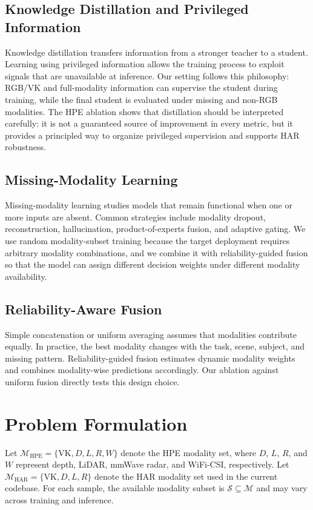 \documentclass[journal]{IEEEtran}
\begin{document}
\subsection{Knowledge Distillation and Privileged Information}
Knowledge distillation transfers information from a stronger teacher to a student. Learning using privileged information allows the training process to exploit signals that are unavailable at inference. Our setting follows this philosophy: RGB/VK and full-modality information can supervise the student during training, while the final student is evaluated under missing and non-RGB modalities. The HPE ablation shows that distillation should be interpreted carefully: it is not a guaranteed source of improvement in every metric, but it provides a principled way to organize privileged supervision and supports HAR robustness.

\subsection{Missing-Modality Learning}
Missing-modality learning studies models that remain functional when one or more inputs are absent. Common strategies include modality dropout, reconstruction, hallucination, product-of-experts fusion, and adaptive gating. We use random modality-subset training because the target deployment requires arbitrary modality combinations, and we combine it with reliability-guided fusion so that the model can assign different decision weights under different modality availability.

\subsection{Reliability-Aware Fusion}
Simple concatenation or uniform averaging assumes that modalities contribute equally. In practice, the best modality changes with the task, scene, subject, and missing pattern. Reliability-guided fusion estimates dynamic modality weights and combines modality-wise predictions accordingly. Our ablation against uniform fusion directly tests this design choice.

\section{Problem Formulation}

Let $\mathcal{M}_{\mathrm{HPE}}=\{\mathrm{VK},D,L,R,W\}$ denote the HPE modality set, where $D$, $L$, $R$, and $W$ represent depth, LiDAR, mmWave radar, and WiFi-CSI, respectively. Let $\mathcal{M}_{\mathrm{HAR}}=\{\mathrm{VK},D,L,R\}$ denote the HAR modality set used in the current codebase. For each sample, the available modality subset is $\mathcal{S}\subseteq \mathcal{M}$ and may vary across training and inference.
\end{document}
